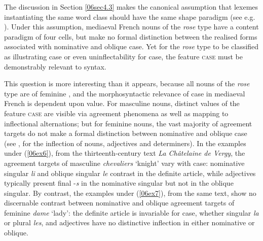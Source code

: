 \documentclass[output=paper,colorlinks,citecolor=brown]{langscibook}
\begin{document}
The discussion in Section \ref{06sec4.3} makes the canonical assumption that lexemes instantiating the same word class should have the same shape paradigm (see e.g. \citealt{corbett2009}). Under this assumption, mediaeval French nouns of the \emph{rose} type have a content paradigm of four cells, but make no formal distinction between the realised forms associated with nominative and oblique case. Yet for the \emph{rose} type to be classified as illustrating case  or even uninflectability for case, the feature \textsc{case} must be demonstrably relevant to syntax.

\largerpage
This question is more interesting than it appears, because all nouns of the \emph{rose} type are of feminine , and the morphosyntactic relevance of case in mediaeval French is dependent upon  value. For masculine nouns, distinct values of the feature \textsc{case} are visible via agreement phenomena as well as mapping to inflectional alternations; but for feminine nouns, the vast majority of agreement targets do not make a formal distinction between nominative and oblique case (see \citealt[75--78, 139--142, 174--179, 287--298]{buridant2019}, for the inflection of nouns, adjectives and determiners). In the examples under (\ref{06ex6}), from the thirteenth-century text \emph{La Châtelaine de Vergy}, the agreement targets of masculine \emph{chevaliers} `knight' vary with case: nominative singular \emph{li} and oblique singular \emph{le} contrast in the definite article, while adjectives typically present final -\emph{s} in the nominative singular but not in the oblique singular. By contrast, the examples under (\ref{06ex7}), from the same text, show no discernable contrast between nominative and oblique agreement targets of feminine \emph{dame} `lady': the definite article is invariable for case, whether singular \emph{la} or plural \emph{les}, and adjectives have no distinctive inflection in either nominative or oblique.
\end{document}
